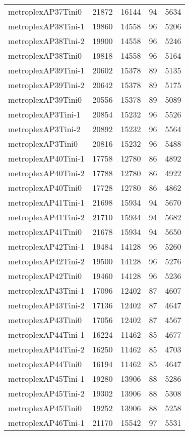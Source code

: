 \begin{longtable}{lrrrr}
metroplexAP37Tini0 & 21872 & 16144 & 94 & 5634 \\
metroplexAP38Tini-1 & 19860 & 14558 & 96 & 5206 \\
metroplexAP38Tini-2 & 19900 & 14558 & 96 & 5246 \\
metroplexAP38Tini0 & 19818 & 14558 & 96 & 5164 \\
metroplexAP39Tini-1 & 20602 & 15378 & 89 & 5135 \\
metroplexAP39Tini-2 & 20642 & 15378 & 89 & 5175 \\
metroplexAP39Tini0 & 20556 & 15378 & 89 & 5089 \\
metroplexAP3Tini-1 & 20854 & 15232 & 96 & 5526 \\
metroplexAP3Tini-2 & 20892 & 15232 & 96 & 5564 \\
metroplexAP3Tini0 & 20816 & 15232 & 96 & 5488 \\
metroplexAP40Tini-1 & 17758 & 12780 & 86 & 4892 \\
metroplexAP40Tini-2 & 17788 & 12780 & 86 & 4922 \\
metroplexAP40Tini0 & 17728 & 12780 & 86 & 4862 \\
metroplexAP41Tini-1 & 21698 & 15934 & 94 & 5670 \\
metroplexAP41Tini-2 & 21710 & 15934 & 94 & 5682 \\
metroplexAP41Tini0 & 21678 & 15934 & 94 & 5650 \\
metroplexAP42Tini-1 & 19484 & 14128 & 96 & 5260 \\
metroplexAP42Tini-2 & 19500 & 14128 & 96 & 5276 \\
metroplexAP42Tini0 & 19460 & 14128 & 96 & 5236 \\
metroplexAP43Tini-1 & 17096 & 12402 & 87 & 4607 \\
metroplexAP43Tini-2 & 17136 & 12402 & 87 & 4647 \\
metroplexAP43Tini0 & 17056 & 12402 & 87 & 4567 \\
metroplexAP44Tini-1 & 16224 & 11462 & 85 & 4677 \\
metroplexAP44Tini-2 & 16250 & 11462 & 85 & 4703 \\
metroplexAP44Tini0 & 16194 & 11462 & 85 & 4647 \\
metroplexAP45Tini-1 & 19280 & 13906 & 88 & 5286 \\
metroplexAP45Tini-2 & 19302 & 13906 & 88 & 5308 \\
metroplexAP45Tini0 & 19252 & 13906 & 88 & 5258 \\
metroplexAP46Tini-1 & 21170 & 15542 & 97 & 5531 \\

\end{longtable}
